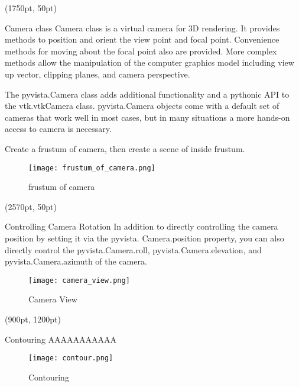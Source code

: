 \documentclass[final]{beamer}
\begin{document}
\begin{frame}[fragile]
\begin{textblock*}{800pt}(1750pt, 50pt)
\begin{block}{Camera class}
Camera class is a virtual camera for 3D rendering.
It provides methods to position and orient the view point and focal point.
Convenience methods for moving about the focal point also are provided.
More complex methods allow the manipulation of the computer graphics model including view up vector, clipping planes, and camera perspective.

The pyvista.Camera class adds additional functionality and a pythonic API to the vtk.vtkCamera class.
pyvista.Camera objects come with a default set of cameras that work well in most cases,
but in many situations a more hands-on access to camera is necessary.

Create a frustum of camera, then create a scene of inside frustum.

\begin{figure}
\texttt{[image: frustum\_of\_camera.png]}
\caption{frustum of camera}
\end{figure}
\end{block}
\end{textblock*}

\begin{textblock*}{800pt}(2570pt, 50pt)
\begin{block}{Controlling Camera Rotation}
In addition to directly controlling the camera position by setting it via the pyvista.
Camera.position property, you can also directly control the pyvista.Camera.roll, pyvista.Camera.elevation, and pyvista.Camera.azimuth of the camera.

\begin{figure}
\texttt{[image: camera\_view.png]}
\caption{Camera View}
\end{figure}
\end{block}
\end{textblock*}

\begin{textblock*}{800pt}(900pt, 1200pt)
\begin{block}{Contouring}
AAAAAAAAAAA

\begin{figure}
\texttt{[image: contour.png]}
\caption{Contouring}
\end{figure}
\end{block}
\end{textblock*}


\end{frame}
\end{document}
